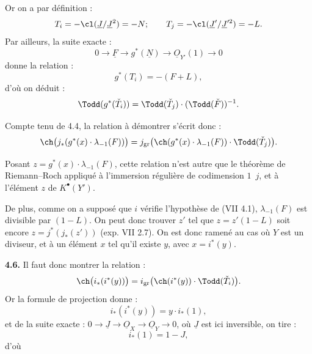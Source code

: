 
Or on a par
définition :
\[
 T_i=-\cl(\underline{J}/\underline{J}^2)=-N;\qquad
 T_j=-\cl(\underline{J}'/\underline{J}'^2)=-L.
\]
Par ailleurs, la suite exacte :
\[
0\longrightarrow \underline{F}\longrightarrow g^*(\underline{N})\longrightarrow \underline{O}_{Y'}(1)\longrightarrow0
\]
donne la relation :
\[
 g^*(T_i)=-(F+L),
\]
d'où on déduit :
\[
 \Todd(g^*(\check T_i))=\Todd(\check T_j)\cdot(\Todd(\check F))^{-1}.
\]

Compte tenu de 4.4, la relation à démontrer s'écrit donc :
\[
 \ch\bigl(j_*(g^*(x)\cdot\lambda_{-1}(F))\bigr)
 =
 j_{\mathrm{gr}}\bigl(\ch(g^*(x)\cdot\lambda_{-1}(F))\cdot\Todd(\check T_j)\bigr).
\]

Posant \(z=g^*(x)\cdot\lambda_{-1}(F)\), cette relation n'est autre que le théorème de Riemann--Roch appliqué à l'immersion régulière de codimension \(1\)~\(j\), et à l'élément \(z\) de \(K^{\bullet}(Y')\).

De plus, comme on a supposé que \(i\) vérifie l'hypothèse de (VII 4.1), \(\lambda_{-1}(F)\) est divisible par \((1-L)\). On peut donc trouver \(z'\) tel que \(z=z'(1-L)\) soit encore \(z=j^*(j_*(z'))\) (exp. VII 2.7). On est donc ramené au cas où \(Y\) est un diviseur, et à un élément \(x\) tel qu'il existe \(y\), avec \(x=i^*(y)\).

\textbf{4.6.} Il faut donc montrer la relation :
\[
 \ch\bigl(i_*(i^*(y))\bigr)
 =
 i_{\mathrm{gr}}\bigl(\ch(i^*(y))\cdot\Todd(\check T_i)\bigr).
\]
Or la formule de projection donne :
\[
 i_*(i^*(y))=y\cdot i_*(1),
\]
et de la suite exacte : \(0\longrightarrow \underline{J}\longrightarrow\underline{O}_X\longrightarrow\underline{O}_Y\longrightarrow0\), où \(\underline{J}\) est ici inversible, on tire :
\[
 i_*(1)=1-J,
\]
d'où

